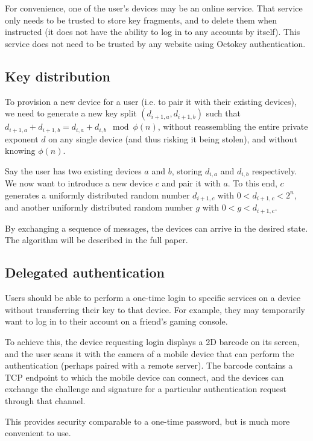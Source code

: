 \documentclass{acm_proc_article-sp}
\begin{document}
For convenience, one of the user's devices may be an online service. That service only needs to be
trusted to store key fragments, and to delete them when instructed (it does not have the ability to
log in to any accounts by itself). This service does not need to be trusted by any website using
Octokey authentication.

\subsection{Key distribution}

To provision a new device for a user (i.e. to pair it with their existing devices), we need to
generate a new key split $(d_{i+1,a}, d_{i+1,b})$ such that
$d_{i+1,a} + d_{i+1,b} = d_{i,a} + d_{i,b} \mod \phi(n)$, without reassembling the entire private
exponent $d$ on any single device (and thus risking it being stolen), and without knowing $\phi(n)$.

Say the user has two existing devices $a$ and $b$, storing $d_{i,a}$ and $d_{i,b}$ respectively. We
now want to introduce a new device $c$ and pair it with $a$. To this end, $c$ generates a uniformly
distributed random number $d_{i+1,c}$ with $0 < d_{i+1,c} < 2^n$, and another uniformly distributed
random number $g$ with $0 < g < d_{i+1,c}$.

By exchanging a sequence of messages, the devices can arrive in the desired state. The algorithm
will be described in the full paper.

\subsection{Delegated authentication}

Users should be able to perform a one-time login to specific services on a device without
transferring their key to that device. For example, they may temporarily want to log in to their
account on a friend's gaming console.

To achieve this, the device requesting login displays a 2D barcode on its screen, and the user scans
it with the camera of a mobile device that can perform the authentication (perhaps paired with a
remote server). The barcode contains a TCP endpoint to which the mobile device can connect, and
the devices can exchange the challenge and signature for a particular authentication request through
that channel.

This provides security comparable to a one-time password, but is much more convenient to use.
\end{document}
